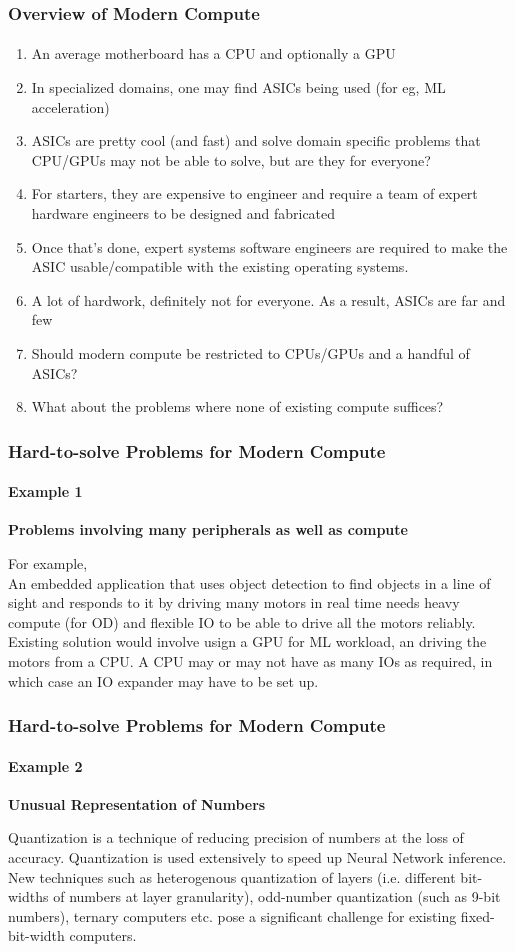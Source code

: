 \documentclass{beamer}
\begin{document}
\begin{frame}[fragile]
\frametitle{Overview of Modern Compute}
\framesubtitle{}
  \begin{enumerate}
    \item An average motherboard has a CPU and optionally a GPU
    \item In specialized domains, one may find ASICs being used (for eg, 
      ML acceleration)
    \item ASICs are pretty cool (and fast) and solve domain specific problems
      that CPU/GPUs may not be able to solve, but are they for everyone?
    \item For starters, they are expensive to engineer and require a team
      of expert hardware engineers to be designed and fabricated
    \item Once that's done, expert systems software engineers are required
      to make the ASIC usable/compatible with the existing operating systems.
    \item A lot of hardwork, definitely not for everyone.  As a result, ASICs are far and few
    \item Should modern compute be restricted to CPUs/GPUs and a handful
      of ASICs?
    \item What about the problems where none of existing compute suffices?
  \end{enumerate}
\end{frame}

\begin{frame}[fragile]
  \frametitle{Hard-to-solve Problems for Modern Compute}
  \framesubtitle{Example 1}
  \textbf{Problems involving many peripherals as well as compute}

  For example, \\

  An embedded application that uses object detection to find
  objects in a line of sight and responds to it by driving many motors in
  real time needs heavy compute (for OD) and flexible IO to be able to 
  drive all the motors reliably. \\

  Existing solution would involve usign a GPU for ML workload, an
  driving the motors from a CPU. A CPU may or may not have as many IOs
  as required, in which case an IO expander may have to be set up.
\end{frame}

\begin{frame}[fragile]
  \frametitle{Hard-to-solve Problems for Modern Compute}
  \framesubtitle{Example 2}
  \textbf{Unusual Representation of Numbers}

  Quantization is a technique of reducing precision of numbers at the loss of
  accuracy. Quantization is used extensively to speed up Neural Network
  inference. New techniques such as heterogenous quantization of layers (i.e.
  different bit-widths of numbers at layer granularity), odd-number quantization
  (such as 9-bit numbers), ternary computers etc. pose a significant challenge
  for existing fixed-bit-width computers. 

\end{frame}
\end{document}
